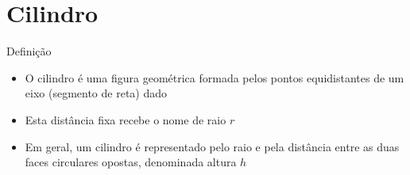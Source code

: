\section{Cilindro}


\begin{frame}[fragile]{Definição}

    \begin{itemize}
        \item O cilindro é uma figura geométrica formada pelos pontos equidistantes de 
            um eixo (segmento de reta) dado
        \pause

        \item Esta distância fixa recebe o nome de raio $r$
        \pause

        \item Em geral, um cilindro é representado pelo raio e pela distância entre as 
            duas faces circulares opostas, denominada altura $h$
        \pause

    \end{itemize}

    \begin{figure}
        \centering
    \end{figure}
\end{frame}

